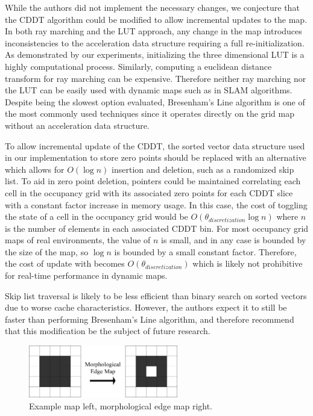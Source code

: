 \documentclass[letterpaper, 10 pt, conference]{ieeeconf}  %
\begin{document}
While the authors did not implement the necessary changes, we conjecture that the CDDT algorithm could be modified to allow incremental updates to the map. In both ray marching and the LUT approach, any change in the map introduces inconsistencies to the acceleration data structure requiring a full re-initialization. As demonstrated by our experiments, initializing the three dimensional LUT is a highly computational process. Similarly, computing a euclidean distance transform for ray marching can be expensive. Therefore neither ray marching nor the LUT can be easily used with dynamic maps such as in SLAM algorithms. Despite being the slowest option evaluated, Bresenham's Line algorithm is one of the most commonly used techniques since it operates directly on the grid map without an acceleration data structure.

To allow incremental update of the CDDT, the sorted vector data structure used in our implementation to store zero points should be replaced with an alternative which allows for $O(\log{n})$ insertion and deletion, such as a randomized skip list. To aid in zero point deletion, pointers could be maintained correlating each cell in the occupancy grid with its associated zero points for each CDDT slice with a constant factor increase in memory usage. In this case, the cost of toggling the state of a cell in the occupancy grid would be $O(\theta_{discretization}\log{n})$ where $n$ is the number of elements in each associated CDDT bin. For most occupancy grid maps of real environments, the value of $n$ is small, and in any case is bounded by the size of the map, so $\log{n}$ is bounded by a small constant factor. Therefore, the cost of update with becomes $O(\theta_{discretization})$ which is likely not prohibitive for real-time performance in dynamic maps.

Skip list traversal is likely to be less efficient than binary search on sorted vectors due to worse cache characteristics. However, the authors expect it to still be faster than performing Bresenham’s Line algorithm, and therefore recommend that this modification be the subject of future research.



\begin{figure}[h]
\begin{center}\includegraphics[width=6.5cm]{edge_map.png}\end{center}
\caption{Example map left, morphological edge map right.}
\label{edge_map}
\end{figure}
\end{document}
